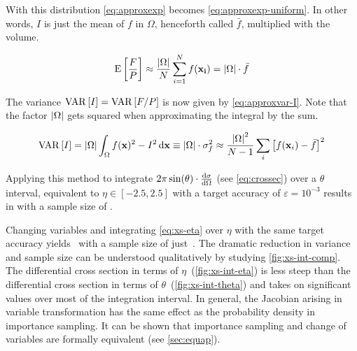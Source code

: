 With this distribution \cref{eq:approxexp}
becomes \cref{eq:approxexp-uniform}. In other words, \(I\) is just
the mean of \(f\) in \(\Omega\), henceforth
called \(\bar{f}\), multiplied with the volume.

\begin{equation}
  \label{eq:approxexp-uniform}
  \operatorname{E}\qty[\frac{F}{P}] \approx
  \frac{\abs{\Omega}}{N}\sum_{i=1}^N f(\vb{x_i}) = \abs{\Omega}\cdot\bar{f}
\end{equation}

The variance \(\operatorname{VAR}\qty[I]=\operatorname{VAR}\qty[F/P]\) is now given
by \cref{eq:approxvar-I}. Note that the factor \(\abs{\Omega}\) gets
squared when approximating the integral by the sum.

\begin{equation}
  \label{eq:approxvar-I}
  \operatorname{VAR}\qty[I] = \abs{\Omega}\int_\Omega f(\vb{x})^2 -
  I^2 \dd{\vb{x}} \equiv \abs{\Omega}\cdot\sigma_f^2 \approx
  \frac{\abs{\Omega}^2}{N-1}\sum_{i}\qty[f(\vb{x}_i) - \bar{f}]^2
\end{equation}

Applying this method to integrate
\(2\pi\sin(\theta)\cdot\dv{\sigma}{\Omega}\) (see \cref{eq:crossec})
over a \(\theta\) interval, equivalent to \(\eta\in [-2.5, 2.5]\) with
a target accuracy of \(\varepsilon=10^{-3}\) results in
 with a sample size of
.

Changing variables and integrating \cref{eq:xs-eta} over \(\eta\) with
the same target accuracy yields~ with a
sample size of just~. The dramatic
reduction in variance and sample size can be understood qualitatively
by studying \cref{fig:xs-int-comp}. The differential cross section in
terms of \(\eta\)~(\cref{fig:xs-int-eta}) is less steep than the
differential cross section in terms of
\(\theta\)~(\cref{fig:xs-int-theta}) and takes on significant values
over most of the integration interval. In general, the Jacobian
arising in variable transformation has the same effect as the
probability density in importance sampling. It can be shown that
importance sampling and change of variables are formally equivalent
(see \ref{sec:equap}).

